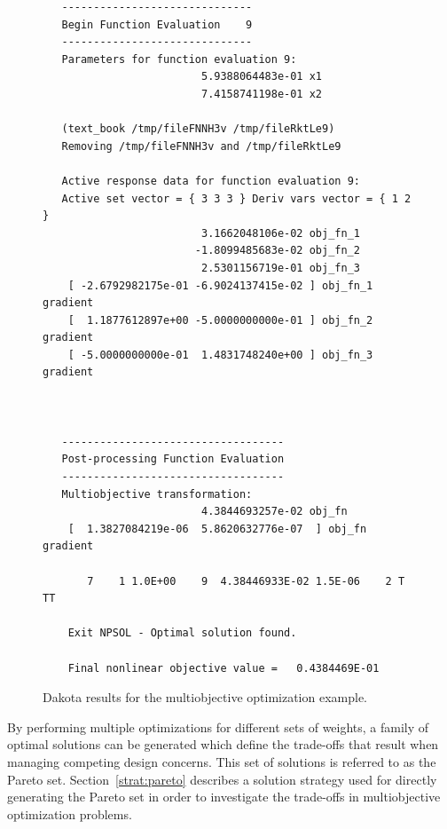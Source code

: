 \begin{figure}
\centering
\begin{bigbox}
\begin{small}
\begin{verbatim}
   ------------------------------
   Begin Function Evaluation    9
   ------------------------------
   Parameters for function evaluation 9:
                         5.9388064483e-01 x1
                         7.4158741198e-01 x2

   (text_book /tmp/fileFNNH3v /tmp/fileRktLe9)
   Removing /tmp/fileFNNH3v and /tmp/fileRktLe9

   Active response data for function evaluation 9:
   Active set vector = { 3 3 3 } Deriv vars vector = { 1 2 }
                         3.1662048106e-02 obj_fn_1
                        -1.8099485683e-02 obj_fn_2
                         2.5301156719e-01 obj_fn_3
    [ -2.6792982175e-01 -6.9024137415e-02 ] obj_fn_1 gradient
    [  1.1877612897e+00 -5.0000000000e-01 ] obj_fn_2 gradient
    [ -5.0000000000e-01  1.4831748240e+00 ] obj_fn_3 gradient



   -----------------------------------
   Post-processing Function Evaluation
   -----------------------------------
   Multiobjective transformation:
                         4.3844693257e-02 obj_fn
    [  1.3827084219e-06  5.8620632776e-07  ] obj_fn gradient

       7    1 1.0E+00    9  4.38446933E-02 1.5E-06    2 T TT     

    Exit NPSOL - Optimal solution found.

    Final nonlinear objective value =   0.4384469E-01
\end{verbatim}
\end{small}
\end{bigbox}
\caption{Dakota results for the multiobjective optimization example.}
\label{opt:figure02}
\end{figure}

By performing multiple optimizations for different sets of weights, a
family of optimal solutions can be generated which define the
trade-offs that result when managing competing design concerns. This
set of solutions is referred to as the Pareto set.
Section~\ref{strat:pareto} describes a solution strategy used for
directly generating the Pareto set in order to investigate the
trade-offs in multiobjective optimization problems.

